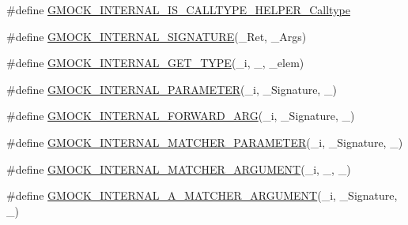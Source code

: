 \begin{DoxyCompactItemize}
\item 
\#define \mbox{\hyperlink{_obj__test_2lib_2googletest-master_2googlemock_2include_2gmock_2gmock-function-mocker_8h_a0968a7caf74c01e48f4ec5596dcbd055}{G\+M\+O\+C\+K\+\_\+\+I\+N\+T\+E\+R\+N\+A\+L\+\_\+\+I\+S\+\_\+\+C\+A\+L\+L\+T\+Y\+P\+E\+\_\+\+H\+E\+L\+P\+E\+R\+\_\+\+Calltype}}
\item 
\#define \mbox{\hyperlink{_obj__test_2lib_2googletest-master_2googlemock_2include_2gmock_2gmock-function-mocker_8h_a0a88ee90715376da8743924b64818ff0}{G\+M\+O\+C\+K\+\_\+\+I\+N\+T\+E\+R\+N\+A\+L\+\_\+\+S\+I\+G\+N\+A\+T\+U\+RE}}(\+\_\+\+Ret,  \+\_\+\+Args)
\item 
\#define \mbox{\hyperlink{_obj__test_2lib_2googletest-master_2googlemock_2include_2gmock_2gmock-function-mocker_8h_a18563a68cd9e8061ee75ee68f2c74c37}{G\+M\+O\+C\+K\+\_\+\+I\+N\+T\+E\+R\+N\+A\+L\+\_\+\+G\+E\+T\+\_\+\+T\+Y\+PE}}(\+\_\+i,  \+\_\+,  \+\_\+elem)
\item 
\#define \mbox{\hyperlink{_obj__test_2lib_2googletest-master_2googlemock_2include_2gmock_2gmock-function-mocker_8h_ae7abd49050035332eb2572ab2ff1472e}{G\+M\+O\+C\+K\+\_\+\+I\+N\+T\+E\+R\+N\+A\+L\+\_\+\+P\+A\+R\+A\+M\+E\+T\+ER}}(\+\_\+i,  \+\_\+\+Signature,  \+\_\+)
\item 
\#define \mbox{\hyperlink{_obj__test_2lib_2googletest-master_2googlemock_2include_2gmock_2gmock-function-mocker_8h_a5ab1c90c3089a1b825ef70fa0273e463}{G\+M\+O\+C\+K\+\_\+\+I\+N\+T\+E\+R\+N\+A\+L\+\_\+\+F\+O\+R\+W\+A\+R\+D\+\_\+\+A\+RG}}(\+\_\+i,  \+\_\+\+Signature,  \+\_\+)
\item 
\#define \mbox{\hyperlink{_obj__test_2lib_2googletest-master_2googlemock_2include_2gmock_2gmock-function-mocker_8h_a2d8d1ef12c162a39811ce0b14a3f8979}{G\+M\+O\+C\+K\+\_\+\+I\+N\+T\+E\+R\+N\+A\+L\+\_\+\+M\+A\+T\+C\+H\+E\+R\+\_\+\+P\+A\+R\+A\+M\+E\+T\+ER}}(\+\_\+i,  \+\_\+\+Signature,  \+\_\+)
\item 
\#define \mbox{\hyperlink{_obj__test_2lib_2googletest-master_2googlemock_2include_2gmock_2gmock-function-mocker_8h_ae1197367da885151c2834b92e0f5b123}{G\+M\+O\+C\+K\+\_\+\+I\+N\+T\+E\+R\+N\+A\+L\+\_\+\+M\+A\+T\+C\+H\+E\+R\+\_\+\+A\+R\+G\+U\+M\+E\+NT}}(\+\_\+i,  \+\_,  \+\_)
\item 
\#define \mbox{\hyperlink{_obj__test_2lib_2googletest-master_2googlemock_2include_2gmock_2gmock-function-mocker_8h_ab124145546366f2495dc81c5ba3ed541}{G\+M\+O\+C\+K\+\_\+\+I\+N\+T\+E\+R\+N\+A\+L\+\_\+\+A\+\_\+\+M\+A\+T\+C\+H\+E\+R\+\_\+\+A\+R\+G\+U\+M\+E\+NT}}(\+\_\+i,  \+\_\+\+Signature,  \+\_\+)
\item 

\end{DoxyCompactItemize}
